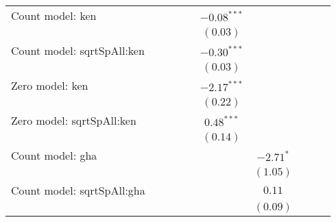\begin{center}
\begin{longtable}{l c c c c c c c c c}
Count model: ken               &               &               &               &                 & $-0.08^{***}$ &                 &                 &               &               \\
                               &               &               &               &                 & $(0.03)$      &                 &                 &               &               \\
Count model: sqrtSpAll:ken     &               &               &               &                 & $-0.30^{***}$ &                 &                 &               &               \\
                               &               &               &               &                 & $(0.03)$      &                 &                 &               &               \\
Zero model: ken                &               &               &               &                 & $-2.17^{***}$ &                 &                 &               &               \\
                               &               &               &               &                 & $(0.22)$      &                 &                 &               &               \\
Zero model: sqrtSpAll:ken      &               &               &               &                 & $0.48^{***}$  &                 &                 &               &               \\
                               &               &               &               &                 & $(0.14)$      &                 &                 &               &               \\
Count model: gha               &               &               &               &                 &               & $-2.71^{*}$     &                 &               &               \\
                               &               &               &               &                 &               & $(1.05)$        &                 &               &               \\
Count model: sqrtSpAll:gha     &               &               &               &                 &               & $0.11$          &                 &               &               \\
                               &               &               &               &                 &               & $(0.09)$        &                 &               &               \\

\end{longtable}
\end{center}
